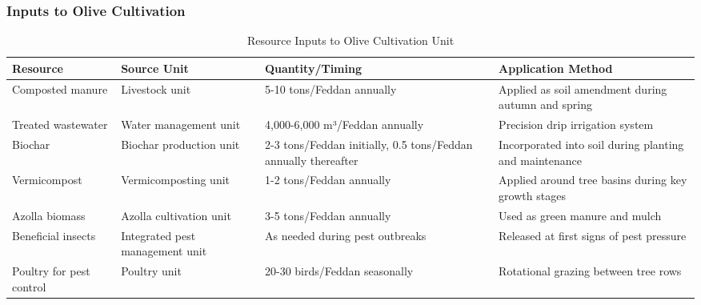 \subsubsection{Inputs to Olive Cultivation}
\begin{table}[h]
\centering
\begin{tabular}{|p{3cm}|p{4cm}|p{4cm}|p{4cm}|}
\hline
\textbf{Resource} & \textbf{Source Unit} & \textbf{Quantity/Timing} & \textbf{Application Method} \\
\hline
Composted manure & Livestock unit & 5-10 tons/Feddan annually & Applied as soil amendment during autumn and spring \\
\hline
Treated wastewater & Water management unit & 4,000-6,000 m³/Feddan annually & Precision drip irrigation system \\
\hline
Biochar & Biochar production unit & 2-3 tons/Feddan initially, 0.5 tons/Feddan annually thereafter & Incorporated into soil during planting and maintenance \\
\hline
Vermicompost & Vermicomposting unit & 1-2 tons/Feddan annually & Applied around tree basins during key growth stages \\
\hline
Azolla biomass & Azolla cultivation unit & 3-5 tons/Feddan annually & Used as green manure and mulch \\
\hline
Beneficial insects & Integrated pest management unit & As needed during pest outbreaks & Released at first signs of pest pressure \\
\hline
Poultry for pest control & Poultry unit & 20-30 birds/Feddan seasonally & Rotational grazing between tree rows \\
\hline
\end{tabular}
\caption{Resource Inputs to Olive Cultivation Unit}
\end{table}

